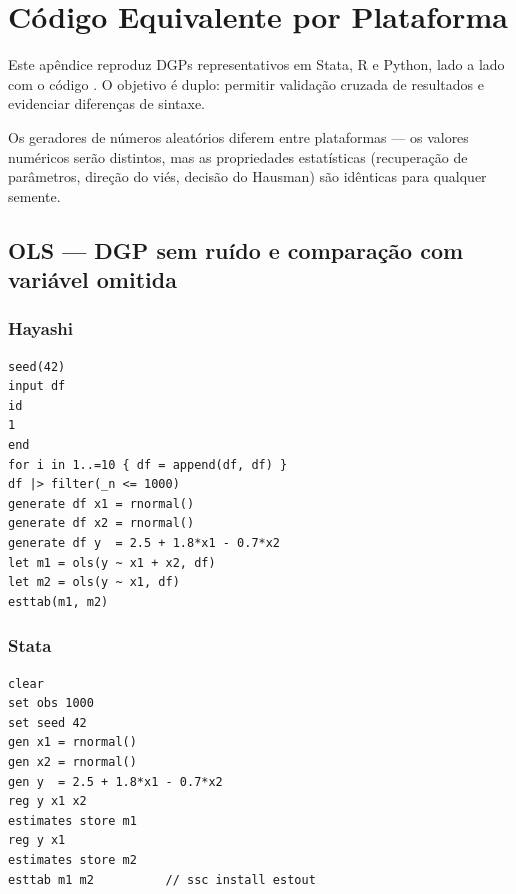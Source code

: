 \chapter{Código Equivalente por Plataforma}
\label{apendice:equivalencias}

Este apêndice reproduz DGPs representativos em Stata, R e Python, lado a
lado com o código \hayashi{}. O objetivo é duplo: permitir validação cruzada
de resultados e evidenciar diferenças de sintaxe.

\begin{nota}
  Os geradores de números aleatórios diferem entre plataformas — os
  valores numéricos serão distintos, mas as propriedades estatísticas
  (recuperação de parâmetros, direção do viés, decisão do Hausman)
  são idênticas para qualquer semente.
\end{nota}

\section{OLS — DGP sem ruído e comparação com variável omitida}

\subsection*{Hayashi}

\begin{lstlisting}
seed(42)
input df
id
1
end
for i in 1..=10 { df = append(df, df) }
df |> filter(_n <= 1000)
generate df x1 = rnormal()
generate df x2 = rnormal()
generate df y  = 2.5 + 1.8*x1 - 0.7*x2
let m1 = ols(y ~ x1 + x2, df)
let m2 = ols(y ~ x1, df)
esttab(m1, m2)
\end{lstlisting}

\subsection*{Stata}

\begin{lstlisting}[language={}, basicstyle=\ttfamily\small,
  frame=single, numbers=none, backgroundcolor=\color{codbg}]
clear
set obs 1000
set seed 42
gen x1 = rnormal()
gen x2 = rnormal()
gen y  = 2.5 + 1.8*x1 - 0.7*x2
reg y x1 x2
estimates store m1
reg y x1
estimates store m2
esttab m1 m2          // ssc install estout
\end{lstlisting}

